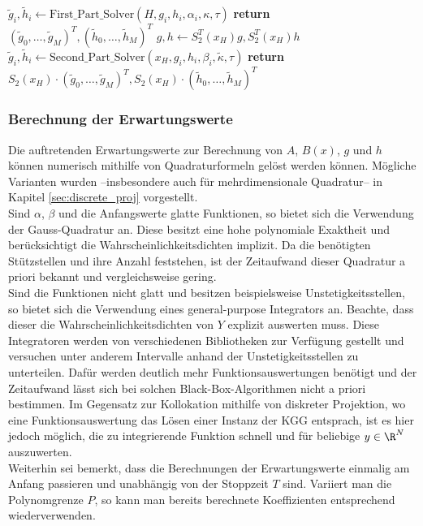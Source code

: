 \begin{algorithm}[ht]
\begin{algorithmic}[1]
        \EndFunction
        		\State $\tilde{g}_i,\tilde{h}_i\gets \text{First\_Part\_Solver}(H,g_i, h_i,\alpha_i,\kappa,\tau)$
        	\EndFor
        	\State \textbf{return} $(\tilde{g}_0,\dots,\tilde{g}_M)^T, (\tilde{h}_0,\dots,\tilde{h}_M)^T$
        \EndFunction
        	\State $g,h\gets S_2^T(x_H)g, S_2^T(x_H)h$
        		\State $\tilde{g}_i,\tilde{h}_i\gets \text{Second\_Part\_Solver}(x_H,g_i,h_i,\beta_i,\tilde{\kappa},\tau)$
        	\EndFor
        	\State \textbf{return} $S_2(x_H)\cdot (\tilde{g}_0,\dots,\tilde{g}_M)^T, S_2(x_H)\cdot (\tilde{h}_0,\dots,\tilde{h}_M)^T$
        \EndFunction
        
    \end{algorithmic}
\end{algorithm}
\subsubsection*{Berechnung der Erwartungswerte}
Die auftretenden Erwartungswerte zur Berechnung von $A$, $B(x)$, $g$ und $h$ können numerisch mithilfe von Quadraturformeln gelöst werden können. Mögliche Varianten wurden --insbesondere auch für mehrdimensionale Quadratur-- in Kapitel \ref{sec:discrete_proj} vorgestellt.\\
Sind $\alpha$, $\beta$ und die Anfangswerte glatte Funktionen, so bietet sich die Verwendung der Gauss-Quadratur an. Diese besitzt eine hohe polynomiale Exaktheit und berücksichtigt die Wahrscheinlichkeitsdichten implizit. Da die benötigten Stützstellen und ihre Anzahl feststehen, ist der Zeitaufwand dieser Quadratur a priori bekannt und vergleichsweise gering.\\[0.2cm]
Sind die Funktionen nicht glatt und besitzen beispielsweise Unstetigkeitsstellen, so bietet sich die Verwendung eines general-purpose Integrators an. Beachte, dass dieser die Wahrscheinlichkeitsdichten von $Y$ explizit auswerten muss. Diese Integratoren werden von verschiedenen Bibliotheken zur Verfügung gestellt und versuchen unter anderem Intervalle anhand der Unstetigkeitsstellen zu unterteilen. Dafür werden deutlich mehr Funktionsauswertungen benötigt und der Zeitaufwand lässt sich bei solchen Black-Box-Algorithmen nicht a priori bestimmen. Im Gegensatz zur Kollokation mithilfe von diskreter Projektion, wo eine Funktionsauswertung das Lösen einer Instanz der KGG entsprach, ist es hier jedoch möglich, die zu integrierende Funktion schnell und für beliebige $y\in\R^N$ auszuwerten.\\[0.2cm]
Weiterhin sei bemerkt, dass die Berechnungen der Erwartungswerte einmalig am Anfang passieren und unabhängig von der Stoppzeit $T$ sind. Variiert man die Polynomgrenze $P$, so kann man bereits berechnete Koeffizienten entsprechend wiederverwenden.
